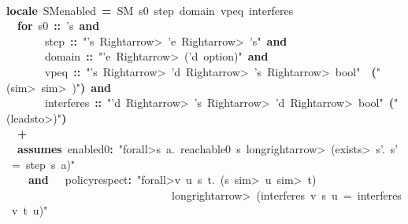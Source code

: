 \documentclass{article}
\newcommand{\syntaxKEYWORDA}[1]{\textcolor[rgb]{0.0,0.4,0.6}{\textbf{#1}}}
\newcommand{\syntaxKEYWORDB}[1]{\textcolor[rgb]{0.0,0.6,0.4}{\textbf{#1}}}
\newcommand{\syntaxLITERALA}[1]{\textcolor[rgb]{1.0,0.0,0.8}{#1}}
\newcommand{\syntaxOPERATOR}[1]{\textcolor[rgb]{0.0,0.0,0.0}{\textbf{#1}}}
\newcommand{\syntaxKEYWORDA}[1]{\textcolor[rgb]{0.0,0.4,0.6}{\textbf{#1}}}
\newcommand{\syntaxKEYWORDB}[1]{\textcolor[rgb]{0.0,0.6,0.4}{\textbf{#1}}}
\newcommand{\syntaxLITERALA}[1]{\textcolor[rgb]{1.0,0.0,0.8}{#1}}
\newcommand{\syntaxOPERATOR}[1]{\textcolor[rgb]{0.0,0.0,0.0}{\textbf{#1}}}
\newcommand{\syntaxKEYWORDA}[1]{\textcolor[rgb]{0.0,0.4,0.6}{\textbf{#1}}}
\newcommand{\syntaxKEYWORDB}[1]{\textcolor[rgb]{0.0,0.6,0.4}{\textbf{#1}}}
\newcommand{\syntaxLITERALA}[1]{\textcolor[rgb]{1.0,0.0,0.8}{#1}}
\newcommand{\syntaxOPERATOR}[1]{\textcolor[rgb]{0.0,0.0,0.0}{\textbf{#1}}}
\newcommand{\syntaxKEYWORDA}[1]{\textcolor[rgb]{0.0,0.4,0.6}{#1}}
\newcommand{\syntaxKEYWORDB}[1]{\textcolor[rgb]{0.0,0.6,0.4}{#1}}
\newcommand{\syntaxLITERALA}[1]{\textcolor[rgb]{1.0,0.0,0.8}{\textbf{#1}}}
\newcommand{\syntaxOPERATOR}[1]{\textcolor[rgb]{0.0,0.0,0.0}{#1}}
\newcommand{\syntaxKEYWORDA}[1]{\textcolor[rgb]{0.0,0.4,0.6}{\textbf{#1}}}
\newcommand{\syntaxKEYWORDB}[1]{\textcolor[rgb]{0.0,0.6,0.4}{\textbf{#1}}}
\newcommand{\syntaxLITERALA}[1]{\textcolor[rgb]{1.0,0.0,0.8}{#1}}
\newcommand{\syntaxOPERATOR}[1]{\textcolor[rgb]{0.0,0.0,0.0}{\textbf{#1}}}
\newcommand{\syntaxKEYWORDA}[1]{\textcolor[rgb]{0.0,0.4,0.6}{\textbf{#1}}}
\newcommand{\syntaxKEYWORDB}[1]{\textcolor[rgb]{0.0,0.6,0.4}{\textbf{#1}}}
\newcommand{\syntaxLITERALA}[1]{\textcolor[rgb]{1.0,0.0,0.8}{#1}}
\newcommand{\syntaxOPERATOR}[1]{\textcolor[rgb]{0.0,0.0,0.0}{\textbf{#1}}}
\begin{document}
\hspace*{\fill}\\
\syntaxKEYWORDA{locale}{\ }SM\usebox{\underscorebox}enabled{\ }\syntaxOPERATOR{=}{\ }SM{\ }s0{\ }step{\ }domain{\ }vpeq{\ }interferes\hspace*{\fill}\\
{\ }{\ }\syntaxKEYWORDB{for}{\ }s0{\ }\syntaxOPERATOR{::}{\ }'s{\ }\syntaxKEYWORDB{and}\hspace*{\fill}\\
{\ }{\ }{\ }{\ }{\ }{\ }{\ }step{\ }\syntaxOPERATOR{::}{\ }\syntaxLITERALA{"'s{\ }\<Rightarrow>{\ }'e{\ }\<Rightarrow>{\ }'s"}{\ }\syntaxKEYWORDB{and}\hspace*{\fill}\\
{\ }{\ }{\ }{\ }{\ }{\ }{\ }domain{\ }\syntaxOPERATOR{::}{\ }\syntaxLITERALA{"'e{\ }\<Rightarrow>{\ }('d{\ }option)"}{\ }\syntaxKEYWORDB{and}\hspace*{\fill}\\
{\ }{\ }{\ }{\ }{\ }{\ }{\ }vpeq{\ }\syntaxOPERATOR{::}{\ }\syntaxLITERALA{"'s{\ }\<Rightarrow>{\ }'d{\ }\<Rightarrow>{\ }'s{\ }\<Rightarrow>{\ }bool"}{\ }{\ }\syntaxOPERATOR{(}\syntaxLITERALA{"(\usebox{\underscorebox}{\ }\<sim>{\ }\usebox{\underscorebox}{\ }\<sim>{\ }\usebox{\underscorebox})"}\syntaxOPERATOR{)}{\ }\syntaxKEYWORDB{and}\hspace*{\fill}\\
{\ }{\ }{\ }{\ }{\ }{\ }{\ }interferes{\ }\syntaxOPERATOR{::}{\ }\syntaxLITERALA{"'d{\ }\<Rightarrow>{\ }'s{\ }\<Rightarrow>{\ }'d{\ }\<Rightarrow>{\ }bool"}{\ }\syntaxOPERATOR{(}\syntaxLITERALA{"(\usebox{\underscorebox}{\ }\usebox{\atbox}{\ }\usebox{\underscorebox}{\ }\<leadsto>\usebox{\underscorebox})"}\syntaxOPERATOR{)}\hspace*{\fill}\\
{\ }{\ }\syntaxOPERATOR{+}\hspace*{\fill}\\
{\ }{\ }\syntaxKEYWORDB{assumes}{\ }enabled0\syntaxOPERATOR{:}{\ }\syntaxLITERALA{"\<forall>s{\ }a.{\ }reachable0{\ }s{\ }\<longrightarrow>{\ }(\<exists>{\ }s'.{\ }s'{\ }={\ }step{\ }s{\ }a)"}\hspace*{\fill}\\
{\ }{\ }{\ }{\ }\syntaxKEYWORDB{and}{\ }{\ }{\ }policy\usebox{\underscorebox}respect\syntaxOPERATOR{:}{\ }\syntaxLITERALA{"\<forall>v{\ }u{\ }s{\ }t.{\ }(s{\ }\<sim>{\ }u{\ }\<sim>{\ }t)}\hspace*{\fill}\\
\syntaxLITERALA{{\ }{\ }{\ }{\ }{\ }{\ }{\ }{\ }{\ }{\ }{\ }{\ }{\ }{\ }{\ }{\ }{\ }{\ }{\ }{\ }{\ }{\ }{\ }{\ }{\ }{\ }{\ }{\ }{\ }{\ }\<longrightarrow>{\ }(interferes{\ }v{\ }s{\ }u{\ }={\ }interferes{\ }v{\ }t{\ }u)"}\hspace*{\fill}\\
\end{document}
